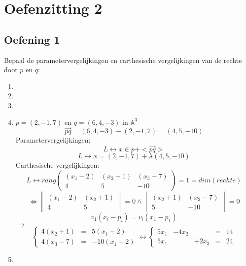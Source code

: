 \documentclass[main.tex]{subfiles}
\begin{document}
\section{Oefenzitting 2}
\label{sec:oefenzitting-2}

\subsection*{Oefening 1}
Bepaal de parametervergelijkingen en carthesische vergelijkingen van de rechte door $p$ en $q$:
\begin{enumerate}
\item 
{}
\item
{}
\item
{}
\item $p = (2,-1,7)$ en $q=(6,4,-3)$ in $\mathbb{A}^{3}$\\
  \[ \overrightarrow{pq} = (6,4,-3) - (2,-1,7) = (4,5,-10) \]
  Parametervergelijkingen:
  \[ L \leftrightarrow x \in p + <\overrightarrow{pq}> \]
  \[ L \leftrightarrow x = (2,-1,7) + \lambda(4,5,-10) \]
  Carthesische vergelijkingen:
  \[
  L \leftrightarrow
  rang
  \begin{pmatrix}
    (x_{1}-2) & (x_{2}+1) & (x_{3}-7)\\
    4 & 5 & -10
  \end{pmatrix}
  = 1 = dim(rechte)
  \]
  \[
  \Leftrightarrow 
  \begin{vmatrix}
    (x_{1}-2) & (x_{2}+1)\\
    4 & 5
  \end{vmatrix}
  = 0
  \wedge
  \begin{vmatrix}
    (x_{2}+1) & (x_{3}-7)\\
    5 & -10
  \end{vmatrix}
  = 0
  \]
  \[ v_{1}(x_{i}-p_{i}) = v_{i}(x_{1}-p_{1}) \]
  $\rightarrow$
  \[
  \left\{
    \begin{array}{ccc}
      4(x_{2}+1) &=& 5(x_{1}-2)\\
      4(x_{3}-7) &=& -10(x_{1}-2)
    \end{array}
  \right.
  \leftrightarrow
  \left\{
    \begin{array}{ccccc}
      5x_{1}&-4x_{2}&&=&14\\
      5x_{1}&&+2x_{3}&=&24
    \end{array}
  \right.
  \]
\item
{}
\end{enumerate}
\end{document}
